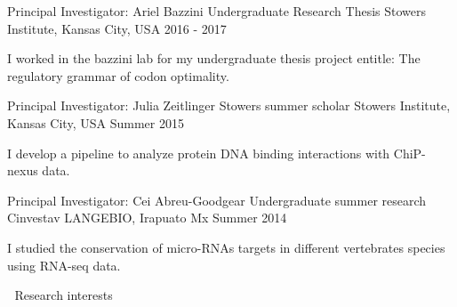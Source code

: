 \begin{cventries}
 \cventry
        {Principal Investigator: Ariel Bazzini} %
        {Undergraduate Research Thesis} %
        {Stowers Institute, Kansas City, USA} %
        {2016 - 2017} %
        {
          \begin{cvitems} %
            \item {
            \begin{flushleft}
              I worked in the bazzini lab for my undergraduate thesis project
              entitle: The regulatory grammar of codon optimality.
          \end{flushleft}
            }
          \end{cvitems}
        }
 \cventry
        {Principal Investigator: Julia Zeitlinger} %
        {Stowers summer scholar} %
        {Stowers Institute, Kansas City, USA} %
        {Summer 2015} %
        {
          \begin{cvitems} %
            \item {
            \begin{flushleft}
              I develop a pipeline to analyze protein DNA binding interactions
              with ChiP-nexus data.
          \end{flushleft}
            }
          \end{cvitems}
        }
 \cventry
        {Principal Investigator: Cei Abreu-Goodgear} %
        {Undergraduate summer research} %
        {Cinvestav LANGEBIO, Irapuato Mx} %
        {Summer 2014} %
        {
          \begin{cvitems} %
            \item {
            \begin{flushleft}
              I studied the conservation of micro-RNAs targets in different
              vertebrates species using RNA-seq data.
          \end{flushleft}
            }
          \end{cvitems}
        }
\cventry
        {$\;$} %
        {Research interests} %
        {$\;$} %
        {$\;$} %
        {
          \begin{cvitems} %

\end{cvitems}}
\end{cventries}

